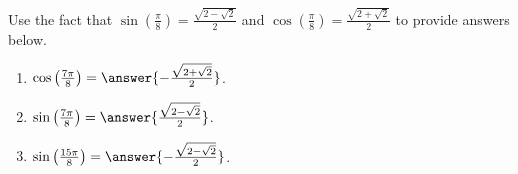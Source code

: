 \documentclass{ximera}
\author{Kenneth Berglund}
\begin{document}
\begin{exercise}
Use the fact that $\sin\left(\frac{\pi}{8}\right) = \frac{\sqrt{2 - \sqrt{2}}}{2}$ and $\cos\left(\frac{\pi}{8}\right) = \frac{\sqrt{2 + \sqrt{2}}}{2}$ to provide answers below.

\begin{enumerate}
\item $\cos\left(\frac{7\pi}{8}\right) =  \answer{-\frac{\sqrt{2 + \sqrt{2}}}{2}}$.

\item $\sin\left(\frac{7\pi}{8}\right) = \answer{\frac{\sqrt{2 - \sqrt{2}}}{2}}$.

\item $\sin\left(\frac{15\pi}{8}\right) = \answer{-\frac{\sqrt{2 - \sqrt{2}}}{2}}$.

\end{enumerate}

\end{exercise}
\end{document}
